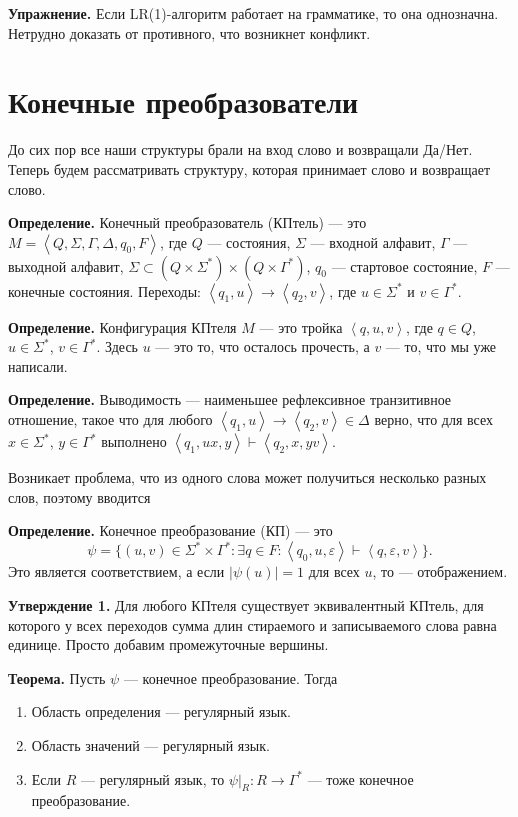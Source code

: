 \QED

\textbf{Упражнение.} Если LR(1)-алгоритм работает на грамматике, то она однозначна.
Нетрудно доказать от противного, что возникнет конфликт.

\section{Конечные преобразователи}
До сих пор все наши структуры брали на вход слово и возвращали Да/Нет. Теперь будем рассматривать структуру, которая принимает слово и возвращает слово.

\textbf{Определение.} Конечный преобразователь (КПтель) --- это $M = \left< Q, \Sigma, \Gamma, \Delta, q_0, F \right>$, где $Q$ --- состояния, $\Sigma$ --- входной алфавит, $\Gamma$ --- выходной алфавит, $\Sigma \subset (Q \times \Sigma^*) \times (Q \times \Gamma^*)$, $q_0$ --- стартовое состояние, $F$ --- конечные состояния.
Переходы: $\left< q_1, u \right> \to \left< q_2, v \right>$, где $u \in \Sigma^*$ и $v \in \Gamma^*$.

\textbf{Определение.} Конфигурация КПтеля $M$ --- это тройка $\left< q, u, v \right>$, где $q \in Q$, $u \in \Sigma^*$, $v \in \Gamma^*$.
Здесь $u$ --- это то, что осталось прочесть, а $v$ --- то, что мы уже написали.

\textbf{Определение.} Выводимость --- наименьшее рефлексивное транзитивное отношение, такое что для любого $\left<q_1, u \right> \to \left< q_2, v \right> \in \Delta$ верно, что для всех $x \in \Sigma^*$, $y \in \Gamma^*$ выполнено $\left<q_1, ux, y \right> \vdash \left< q_2, x, yv \right>$.

Возникает проблема, что из одного слова может получиться несколько разных слов, поэтому вводится

\textbf{Определение.} Конечное преобразование (КП) --- это 
\[
    \psi = \{(u, v) \in \Sigma^* \times \Gamma^*: \exists q \in F: \left< q_0, u, \varepsilon \right> \vdash \left< q, \varepsilon, v \right>\}.
\]
Это является соответствием, а если $|\psi(u)| = 1$ для всех $u$, то --- отображением.

\textbf{Утверждение 1.} Для любого КПтеля существует эквивалентный КПтель, для которого у всех переходов сумма длин стираемого и записываемого слова равна единице.
Просто добавим промежуточные вершины.

\textbf{Теорема.} Пусть $\psi$ --- конечное преобразование. Тогда
\begin{enumerate}
    \item Область определения --- регулярный язык.
    \item Область значений --- регулярный язык.
    \item Если $R$ --- регулярный язык, то $\psi|_R: R \to \Gamma^*$ --- тоже конечное преобразование.
\end{enumerate}


